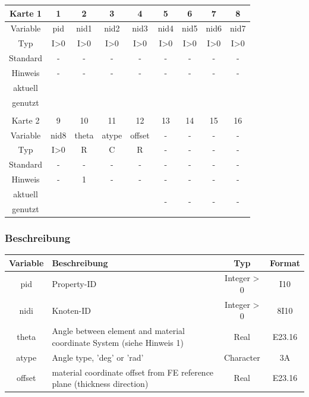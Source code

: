 \documentclass[11pt,titlepage,listof=totoc,bibliography=totoc,twoside]{scrreprt}
\begin{document}
{{\begin{table}[htbp]
\centering
\begin{tabularx}{\textwidth}{cCCCCCCCC}
\toprule
Karte 1	& 1		& 2		& 3		& 4		& 5		& 6		& 7	& 8		\\
\midrule
Variable& pid		& nid1		& nid2		& nid3		& nid4		& nid5		& nid6	& nid7		\\
Typ	& I>0		& I>0		& I>0		& I>0		& I>0		& I>0		& I>0	& I>0		\\
Standard& -		& -		& -		& -		& -		& -		& -	& -		\\
Hinweis	& -		& -		& -		& -		& -		& -		& -	& -		\\
aktuell	& 	& 	& 	& 	& 	& 	& 	& 	\\
genutzt \\
\\
Karte 2	& 9		& 10		& 11		& 12		& 13		& 14		& 15	& 16	\\
\midrule
Variable& nid8		& theta		& atype		& offset	& -		& -		& -	& -	\\
Typ	& I>0		& R		& C		& R		& -		& -		& -	& -	\\
Standard& -		& -		& -		& -		& -		& -		& -	& -	\\
Hinweis	& -		& 1		& -		& -		& -		& -		& -	& -	\\
aktuell	& 	& 	& 	& 	& 	& \multirow{2}{*}{-}	& 	& 	\\
genutzt \\
\bottomrule
\end{tabularx}
\end{table}

\subsubsection{Beschreibung}

\begin{tabularx}{\textwidth}{cXcc}
\toprule
Variable& Beschreibung									& Typ		& Format\\
\midrule
pid	& Property-ID									& Integer > 0	& I10	\\
nidi	& Knoten-ID									& Integer > 0	& 8I10	\\
theta	& Angle between element and material coordinate System (siehe Hinweis 1)	& Real		& E23.16\\
atype	& Angle type, 'deg' or 'rad'							& Character	& 3A	\\
offset	& material coordinate offset from FE reference plane (thickness direction)	& Real		& E23.16\\
\bottomrule
\end{tabularx}

}}
\end{document}
